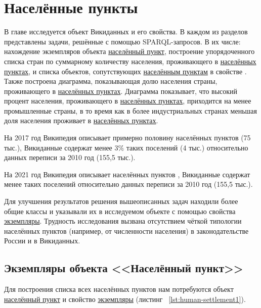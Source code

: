 \chapter{Населённые пункты}
\label{ch:human-settlement}

	В главе исследуется объект Викиданных  и его свойства. В каждом из разделов представлены задачи, решённые с помощью SPARQL-запросов. В их числе: нахождение экземпляров объекта \href{http://www.wikidata.org/entity/Q486972}{населённый пункт}, построение упорядоченного списка стран по суммарному количеству населения, проживающего в \href{http://www.wikidata.org/entity/Q486972}{населённых пунктах}, и списка объектов, сопутствующих \href{http://www.wikidata.org/entity/Q486972}{населённым пунктам} в свойстве . Также построена диаграмма, показывающая долю населения страны, проживающего в \href{http://www.wikidata.org/entity/Q486972}{населённых пунктах}. Диаграмма показывает, что высокий процент населения, проживающего в \href{http://www.wikidata.org/entity/Q486972}{населённых пунктах}, приходится на менее промышленные страны, в то время как в более индустриальных странах меньшая доля населения проживает в \href{http://www.wikidata.org/entity/Q486972}{населённых пунктах}. 

На 2017 год Википедия описывает примерно половину населённых пунктов (75 тыс.), Викиданные содержат менее 3\% таких поселений (4 тыс.) относительно данных переписи за 2010 год (155,5 тыс.). 

На 2021 год Википедия описывает населённых пунктов , Викиданные содержат менее  таких поселений относительно данных переписи за 2010 год (155,5 тыс.). 

Для улучшения результатов решения вышеописанных задач находили более общие классы и указывали их в исследуемом объекте с помощью свойства \href{http://www.wikidata.org/entity/P31}{экземпляры}. Трудность исследования вызвана отсутствием чёткой типологии населённых пунктов (например, от численности населения) в законодательстве России и в Викиданных.

\section{Экземпляры объекта <<Населённый пункт>>}

Для построения списка всех населённых пунктов нам потребуются объект 
\href{http://www.wikidata.org/entity/Q486972}{населённый пункт} и свойство \href{http://www.wikidata.org/entity/P31}{экземпляры}
(листинг ~\protect\ref{lst:human-settlement1}).

